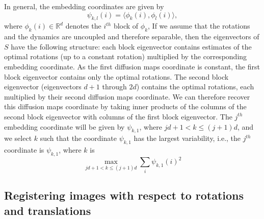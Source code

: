 \documentclass[12pt]{article}
\begin{document}
In general, the embedding coordinates are given by
\begin{equation} \label{eq:vdm_coord}
\psi_{k,l} (i) = \langle \phi_k(i), \phi_l(i) \rangle,
\end{equation}
where $\phi_k(i) \in \mathbb{R}^d$ denotes the $i^{th}$ block of $\phi_k$, 
%
If we assume that the rotations and the dynamics are uncoupled and therefore separable, then the eigenvectors of $S$ have the following structure: each block eigenvector contains estimates of the optimal rotations (up to a constant rotation) multiplied by the corresponding embedding coordinate.
%
As the first diffusion maps coordinate is constant, the first block eigenvector contains only the optimal rotations.
%
The second block eigenvector (eigenvectors $d+1$ through $2d$) contains the optimal rotations, each multiplied by their second diffusion maps coordinate. 
%
We can therefore recover this diffusion maps coordinate by taking inner products of the columns of the second block eigenvector with columns of the first block eigenvector.
%
The $j^{th}$ embedding coordinate will be given by $\psi_{k,1}$, where $jd +1 < k \le (j+1)d$,
and we select $k$ such that the coordinate $\psi_{k, 1}$ has the largest variability, i.e., the $j^{th}$ coordinate is $\psi_{k,1}$, where $k$ is
$$ \max_{jd +1 < k \le (j+1)d} \sum_i \psi_{k,1} (i)^2 $$

\subsection{Registering images with respect to rotations and translations} \label{subsec:trans_rot_register}
\end{document}
